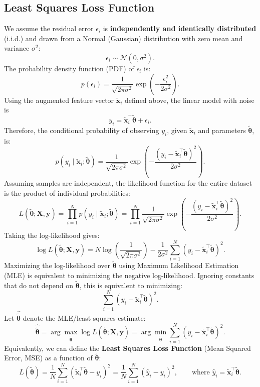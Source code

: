\documentclass{article}
\begin{document}
\subsection{Least Squares Loss Function}

We assume the residual error $\epsilon_i$ is \textbf{independently and identically distributed} (i.i.d.) and drawn from a Normal (Gaussian) distribution with zero mean and variance $\sigma^2$:
\[
\epsilon_i \sim \mathcal{N}(0,\sigma^2).
\]
The probability density function (PDF) of \(\epsilon_i\) is:
\[
p(\epsilon_i) = \frac{1}{\sqrt{2\pi\sigma^2}} \exp\left(-\frac{\epsilon_i^2}{2\sigma^2}\right).
\]
Using the augmented feature vector $\tilde{\mathbf{x}}_i$ defined above, the linear model with noise is
\[
y_i = \tilde{\mathbf{x}}_i^\top \tilde{\boldsymbol{\theta}} + \epsilon_i.
\]
Therefore, the conditional probability of observing \(y_i\), given \(\tilde{\mathbf{x}}_i\) and parameters \(\tilde{\boldsymbol{\theta}}\), is:
\[
p(y_i \mid \tilde{\mathbf{x}}_i; \tilde{\boldsymbol{\theta}})
= \frac{1}{\sqrt{2\pi\sigma^2}}
\exp\left(-\frac{(y_i - \tilde{\mathbf{x}}_i^\top \tilde{\boldsymbol{\theta}})^2}{2\sigma^2}\right).
\]
Assuming samples are independent, the likelihood function for the entire dataset is the product of individual probabilities:
\[
L(\tilde{\boldsymbol{\theta}}; \mathbf{X}, \mathbf{y})
= \prod_{i=1}^N p(y_i \mid \tilde{\mathbf{x}}_i; \tilde{\boldsymbol{\theta}})
= \prod_{i=1}^N \frac{1}{\sqrt{2\pi\sigma^2}}
\exp\left(-\frac{(y_i - \tilde{\mathbf{x}}_i^\top \tilde{\boldsymbol{\theta}})^2}{2\sigma^2}\right).
\]
Taking the log-likelihood gives:
\[
\log L(\tilde{\boldsymbol{\theta}}; \mathbf{X}, \mathbf{y})
= N\log\left(\frac{1}{\sqrt{2\pi\sigma^2}}\right)
-\frac{1}{2\sigma^2}\sum_{i=1}^N (y_i - \tilde{\mathbf{x}}_i^\top\tilde{\boldsymbol{\theta}})^2.
\]
Maximizing the log-likelihood over \(\tilde{\boldsymbol{\theta}}\) using Maximum Likelihood Estimation (MLE) is equivalent to minimizing the negative log-likelihood. Ignoring constants that do not depend on \(\tilde{\boldsymbol{\theta}}\), this is equivalent to minimizing:
\[
\sum_{i=1}^N (y_i - \tilde{\mathbf{x}}_i^\top\tilde{\boldsymbol{\theta}})^2.
\]
Let \(\hat{\tilde{\boldsymbol{\theta}}}\) denote the MLE/least-squares estimate:
\[
\hat{\tilde{\boldsymbol{\theta}}}
= \arg\max_{\tilde{\boldsymbol{\theta}}} \log L(\tilde{\boldsymbol{\theta}};\mathbf{X},\mathbf{y})
= \arg\min_{\tilde{\boldsymbol{\theta}}} \sum_{i=1}^N (y_i - \tilde{\mathbf{x}}_i^\top\tilde{\boldsymbol{\theta}})^2.
\]
Equivalently, we can define the \textbf{Least Squares Loss Function} (Mean Squared Error, MSE) as a function of \(\tilde{\boldsymbol{\theta}}\):
\[
L(\tilde{\boldsymbol{\theta}}) = \frac{1}{N} \sum_{i=1}^N (\tilde{\mathbf{x}}_i^\top \tilde{\boldsymbol{\theta}} - y_i)^2
= \frac{1}{N}\sum_{i=1}^N (\hat{y}_i - y_i)^2,
\qquad \text{where } \hat{y}_i = \tilde{\mathbf{x}}_i^\top\tilde{\boldsymbol{\theta}}.
\]
\end{document}
